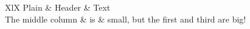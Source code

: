 \begin{RpgTable}[title={Test Table},noheader]{XlX}
    Plain & Header & Text
    \\
	The middle column & is & small, but the first and third are big!
\end{RpgTable}
